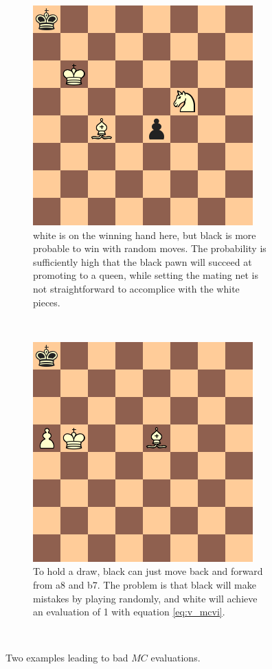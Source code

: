 \begin{figure}
\centering
    \begin{subfigure}[t]{0.45\textwidth}
        \includegraphics[scale=0.5]{fig/diagram_mcvi}
        \caption{white is on the winning hand here, but black is more probable to win with random moves. The probability is sufficiently high that the black pawn will succeed at promoting to a queen, while setting the mating net is not straightforward to accomplice with the white pieces.}
        \label{fig:mcvi1}
    \end{subfigure}
    \qquad
    ~ %
    \begin{subfigure}[t]{0.45\textwidth}
        \includegraphics[scale=0.5]{fig/diagram_mcvi2}
        \caption{To hold a draw, black can just move back and forward from a8 and b7. The problem is that black will make mistakes by playing randomly, and white will achieve an evaluation of 1 with equation \ref{eq:v_mcvi}.}
        \label{fig:mcvi2}
    \end{subfigure}
    ~ %
    \caption{Two examples leading to bad $MC$ evaluations.}
\end{figure}

